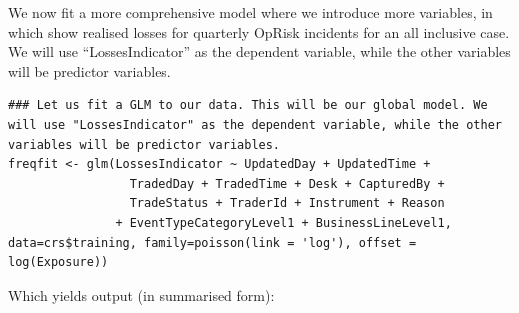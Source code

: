 \documentclass{DissertateUSU}
\begin{document}
We now fit a more comprehensive model where we introduce more variables,
in which show realised losses for quarterly OpRisk incidents for an all
inclusive case. We will use ``LossesIndicator'' as the dependent
variable, while the other variables will be predictor variables.

\singlespacing

\begin{verbatim}
### Let us fit a GLM to our data. This will be our global model. We will use "LossesIndicator" as the dependent variable, while the other variables will be predictor variables.
freqfit <- glm(LossesIndicator ~ UpdatedDay + UpdatedTime +
                 TradedDay + TradedTime + Desk + CapturedBy +
                 TradeStatus + TraderId + Instrument + Reason
               + EventTypeCategoryLevel1 + BusinessLineLevel1,
data=crs$training, family=poisson(link = 'log'), offset = log(Exposure))
\end{verbatim}

\doublespacing

Which yields output (in summarised form):
\end{document}

